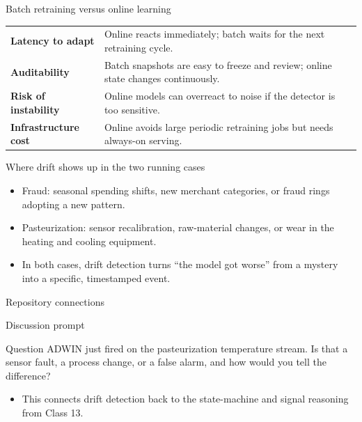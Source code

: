 \begin{frame}{Batch retraining versus online learning}
\begin{tabularx}{\textwidth}{>{\bfseries}l X}
Latency to adapt & Online reacts immediately; batch waits for the next retraining cycle. \\
Auditability & Batch snapshots are easy to freeze and review; online state changes continuously. \\
Risk of instability & Online models can overreact to noise if the detector is too sensitive. \\
Infrastructure cost & Online avoids large periodic retraining jobs but needs always-on serving. \\
\end{tabularx}
\coursefooter
\end{frame}

\begin{frame}{Where drift shows up in the two running cases}
\begin{itemize}
\item Fraud: seasonal spending shifts, new merchant categories, or fraud rings adopting a new pattern.
\item Pasteurization: sensor recalibration, raw-material changes, or wear in the heating and cooling equipment.
\item In both cases, drift detection turns ``the model got worse'' from a mystery into a specific, timestamped event.
\end{itemize}
\coursefooter
\end{frame}

\begin{frame}{Repository connections}
\coursefooter
\end{frame}

\begin{frame}{Discussion prompt}
\begin{block}{Question}
ADWIN just fired on the pasteurization temperature stream. Is that a sensor fault, a process change, or a false alarm, and how would you tell the difference?
\end{block}
\begin{itemize}
\item This connects drift detection back to the state-machine and signal reasoning from Class 13.
\end{itemize}
\coursefooter
\end{frame}

